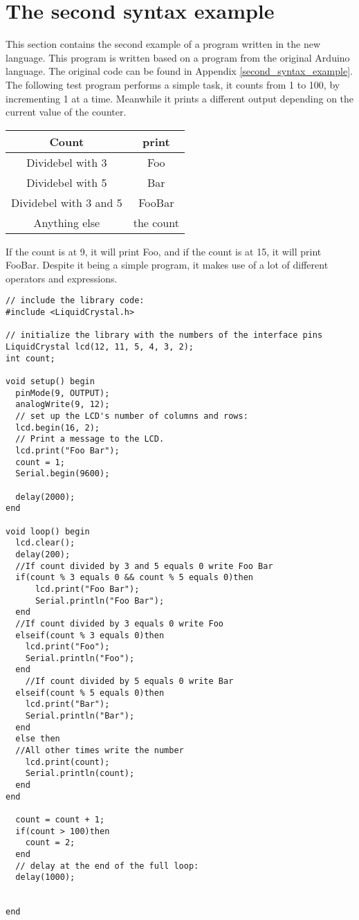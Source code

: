 \section{The second syntax example}
This section contains the second example of a program written in the new language. This program is written based on a program from the original Arduino language. The original code can be found in Appendix \ref{second_syntax_example}. The following test program performs a simple task,
it counts from 1 to 100, by incrementing 1 at a time. Meanwhile it prints a different output depending on the current value of the counter.\\
\begin{table}[H]
\centering
\begin{tabular}{|c|c|}
\hline 
Count & print \\ 
\hline 
Dividebel with 3 & Foo \\ 
\hline 
Dividebel with 5 & Bar \\ 
\hline 
Dividebel with 3 and 5 & FooBar \\ 
\hline 
Anything else & the count \\ 
\hline 
\end{tabular} 
\end{table}

If the count is at 9, it will print Foo, and if the count is at 15, it will print FooBar. Despite it being a simple program, it makes use of a lot of different operators and expressions.

\begin{lstlisting}[caption=LCD code example based on the source language, label=lst:syntax2]
// include the library code:
#include <LiquidCrystal.h>

// initialize the library with the numbers of the interface pins
LiquidCrystal lcd(12, 11, 5, 4, 3, 2);
int count;

void setup() begin
  pinMode(9, OUTPUT);
  analogWrite(9, 12);
  // set up the LCD's number of columns and rows: 
  lcd.begin(16, 2);
  // Print a message to the LCD.
  lcd.print("Foo Bar");
  count = 1;
  Serial.begin(9600);

  delay(2000);
end

void loop() begin
  lcd.clear();
  delay(200);
  //If count divided by 3 and 5 equals 0 write Foo Bar
  if(count % 3 equals 0 && count % 5 equals 0)then
      lcd.print("Foo Bar"); 
      Serial.println("Foo Bar"); 
  end
  //If count divided by 3 equals 0 write Foo 
  elseif(count % 3 equals 0)then
    lcd.print("Foo");
    Serial.println("Foo"); 
  end
    //If count divided by 5 equals 0 write Bar 
  elseif(count % 5 equals 0)then
    lcd.print("Bar");
    Serial.println("Bar"); 
  end
  else then
  //All other times write the number
    lcd.print(count);
    Serial.println(count); 
  end
end

  count = count + 1;
  if(count > 100)then
    count = 2;
  end
  // delay at the end of the full loop:
  delay(1000);


end
\end{lstlisting}
